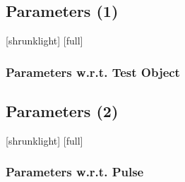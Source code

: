\subsection{Parameters (1)}
[shrunklight]
[full]
\begin{frame}
	\frametitle{Parameters w.r.t. Test Object}
	\centering
	\begin{table}
	\begin{center}
	\end{center}
	\end{table}
\end{frame}


\subsection{Parameters (2)}
[shrunklight]
[full]
\begin{frame}
	\frametitle{Parameters w.r.t. Pulse}
	\centering
	\begin{columns}
	\begin{column}{0.5\textwidth}
	\begin{table}
	\begin{center}
	\end{center}
	\end{table}
	\end{column}
	\begin{column}{0.5\textwidth}
	\end{column}
	\end{columns}	
\end{frame}




